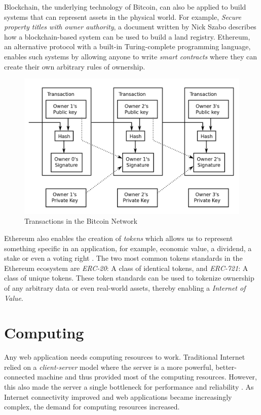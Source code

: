 	Blockchain, the underlying technology of Bitcoin, can also be applied to build systems that can represent assets in the physical world. For example, \textit{Secure property titles with owner authority}\cite{szabo1998nick}, a document written by Nick Szabo describes how a blockchain-based system can be used to build a land registry. Ethereum\cite{buterin2014ethereum}, an alternative protocol with a built-in Turing-complete programming language, enables such systems by allowing anyone to write \textit{smart contracts}\cite{szabo1997formalizing} where they can create their own arbitrary rules of ownership.
	
	\begin{figure}[h]
		\includegraphics[width=\linewidth]{figures/bitcoin-transactions}
		\caption{\label{fig:bitcoin-transactions} Transactions in the Bitcoin Network\protect\cite{image:bitcoin:transaction:1}}
	\end{figure}
	
	Ethereum also enables the creation of \textit{tokens} which allows us to represent something specific in an application, for example, economic value, a dividend, a stake or even a voting right \cite{token:roles:1}. The two most common tokens standards in the Ethereum ecosystem are \textit{ERC-20}\cite{github:eip:20}: A class of identical tokens, and \textit{ERC-721}\cite{github:eip:721}: A class of unique tokens. These token standards can be used to tokenize ownership of any arbitrary data or even real-world assets, thereby enabling a \textit{Internet of Value}\cite{vuong2019long}.

\cleardoublepage
\section{Computing}
	Any web application needs computing resources to work. Traditional Internet relied on a \textit{client-server} model where the server is a more powerful, better-connected machine and thus provided most of the computing resources. However, this also made the server a single bottleneck for performance and reliability \cite{crowcroft2003peer}. As Internet connectivity improved and web applications became increasingly complex, the demand for computing resources increased.
	
